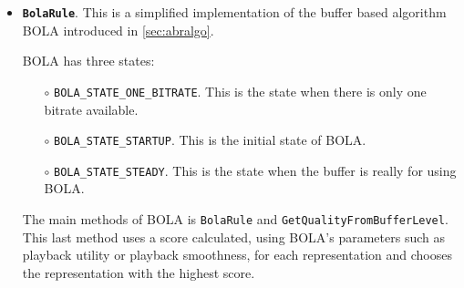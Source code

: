 \begin{itemize}
  \item \textbf{\texttt{BolaRule}}. This is a simplified implementation of the buffer based algorithm
  BOLA introduced in \autoref{sec:abralgo}.

  BOLA has three states:
  \begin{itemize}[noitemsep, topsep=0pt]
    \item[$\circ$] \texttt{BOLA\_STATE\_ONE\_BITRATE}. This is the state when there is only one bitrate available.
    \item[$\circ$] \texttt{BOLA\_STATE\_STARTUP}. This is the initial state of BOLA.
    \item[$\circ$] \texttt{BOLA\_STATE\_STEADY}. This is the state when the buffer is really for using BOLA.
  \end{itemize}

  The main methods of BOLA is \texttt{BolaRule} and \texttt{GetQualityFromBufferLevel}.
  This last method uses a score calculated, using BOLA's parameters such as playback utility or 
  playback smoothness, for each representation and chooses the representation
  with the highest score.
\end{itemize}






